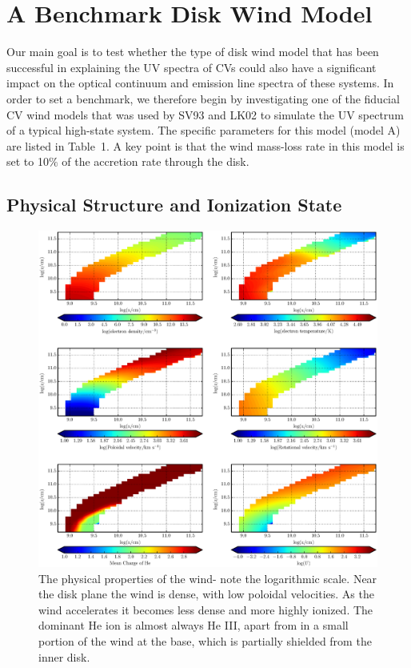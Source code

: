 \documentclass[preprint, a4paper, 11pt]{aastex}
\begin{document}
\nocite{walker1963}

\section{A Benchmark Disk Wind Model}
\label{modela}

Our main goal is to test whether the type of disk wind model that has
been successful in explaining the UV spectra of CVs could also have a
significant impact on the optical continuum and emission line spectra
of these systems. In order to set a benchmark, we therefore begin by
investigating one of the fiducial CV wind models that was used by SV93
and LK02 to simulate the UV spectrum of a typical high-state
system. The specific parameters for this model (model A) are listed in
Table~1. A key point is that the wind mass-loss rate in this model is
set to 10$\%$ of the accretion rate through the disk.

\subsection{Physical Structure and Ionization State}
\label{modela_ionization}

\begin{figure} %
\includegraphics[width=\textwidth]{figures/fig5.eps}
\caption{
The physical properties of the wind- note the logarithmic scale. 
Near the disk plane the wind is dense, with low poloidal velocities.
As the wind accelerates it becomes less dense
and more highly ionized. The dominant He ion
is almost always He III, apart from in a small
portion of the wind at the base, which is partially shielded
from the inner disk.
}
\label{wind}
\end{figure} %
\end{document}
